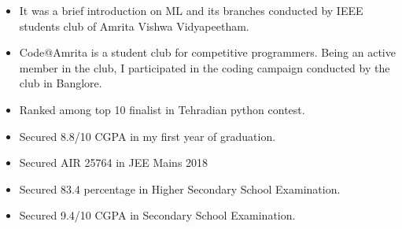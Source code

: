 \documentclass[10pt,a4paper,ragged2e]{altacv}
\begin{document}
\divider

\begin{itemize}
\item It was a brief introduction on ML and its branches conducted by IEEE students club of Amrita Vishwa Vidyapeetham.
\end{itemize}
 
\divider

\begin{itemize}
\item Code@Amrita is a student club for competitive programmers. Being an active member in the club, I participated in the coding campaign conducted by the club in Banglore.
\end{itemize}


\smallskip
\begin{itemize}
\item Ranked among top 10 finalist in Tehradian python contest.
\smallskip
\item Secured 8.8/10 CGPA in my first year of graduation.
\smallskip
\item Secured AIR 25764 in JEE Mains 2018
\smallskip
\item Secured 83.4 percentage in Higher Secondary School Examination.
\smallskip
\item Secured 9.4/10 CGPA in Secondary School Examination.
\end{itemize}





\end{document}
